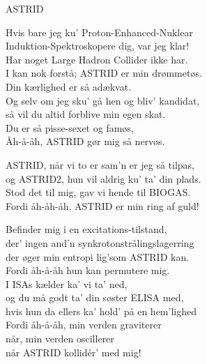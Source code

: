 \begin{song}{ASTRID}
  \begin{SBChorus}
    Hvis bare jeg ku’ Proton-Enhanced-Nuklear\\
    Induktion-Spektroskopere dig, var jeg klar!\\
    Har noget Large Hadron Collider ikke har.\\
    I kan nok forstå; ASTRID er min drømmetøs.\\\medskip
    Din kærlighed er så adækvat.\\
    Og selv om jeg sku’ gå hen og bliv’ kandidat,\\
    så vil du altid forblive min egen skat.\\
    Du er så pisse-sexet og famøs,\\
    Åh-å-åh, ASTRID gør mig så nervøs.
  \end{SBChorus}

  \begin{SBSection*}
    ASTRID, når vi to er sam’n er jeg så tilpas,\\
    og ASTRID2, hun vil aldrig ku’ ta’ din plads.\\
    Stod det til mig, gav vi hende til BIOGAS.\\
    Fordi åh-åh-åh, ASTRID er min ring af guld!
  \end{SBSection*}

  \begin{SBChorus}
    Befinder mig i en excitations-tilstand,\\
    der’ ingen and’n synkrotonstrålingslagerring\\
    der øger min entropi lig’som ASTRID kan.\\
    Fordi åh-å-åh hun kan permutere mig.\\\medskip
    I ISAs kælder ka’ vi ta’ ned,\\
    og du må godt ta’ din søster ELISA med,\\
    hvis hun da ellers ka’ hold’ på en hem’lighed\\
    Fordi åh-å-åh, min verden graviterer\\
    når, min verden oscillerer\\
    når ASTRID kollidér’ med mig!
  \end{SBChorus}
\end{song}